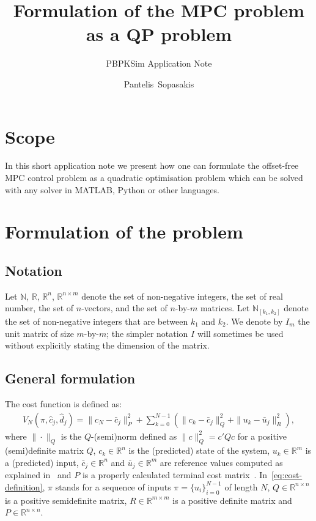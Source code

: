 \documentclass[12pt]{report}
\title{Formulation of the MPC problem as a QP problem}
\subtitle{PBPKSim Application Note}
\author{Pantelis~Sopasakis}
\newcommand{\N}{\mathbb{N}}
\renewcommand{\Re}{\mathbb{R}}
\newcommand{\bcj}{\bar{c}_j}
\newcommand{\buj}{\bar{u}_j}
\begin{document}
\maketitle

\section*{Scope}
In this short application note we present how 
one can formulate the offset-free MPC control problem
as a quadratic optimisation problem which can be solved
with any solver in MATLAB, Python or other languages. 

\section*{Formulation of the problem}

\subsection*{Notation}
Let $\N$, $\Re$, $\Re^n$, $\Re^{n\times m}$ denote the set
of non-negative integers, the set of real number, the set of $n$-vectors,
and the set of $n$-by-$m$ matrices. Let $\N_{[k_1, k_2]}$ denote the
set of non-negative integers that are between $k_1$ and $k_2$.
We denote by $I_m$ the unit matrix of size $m$-by-$m$; the simpler
notation $I$ will sometimes be used without explicitly stating the
dimension of the matrix.

\subsection*{General formulation}
The cost function is defined as:
\begin{align}\label{eq:cost-definition}
V_N(\pi, \hat{c}_j, \hat{d}_j) = \|c_N - \bar{c}_j\|_P^2 + \sum_{k=0}^{N-1}\left( 
\|c_k-\bar{c}_j\|_Q^2+\|u_k-\bar{u}_j\|_R^2
\right),
\end{align}
where $\|\cdot\|_Q$ is the $Q$-(semi)norm defined as $\|c\|_Q^2=c'Qc$ for 
a positive (semi)definite matrix $Q$, $c_k\in\Re^n$ is the (predicted) state of the system,
$u_k\in\Re^m$ is a (predicted) input, $\bcj\in\Re^n$ and $\buj\in\Re^m$ are reference values
computed as explained in~\cite[Eq. (33)]{SopPatSar14} and $P$ is a 
properly calculated terminal cost matrix~\cite[Eq. (32)]{SopPatSar14}.
In~\eqref{eq:cost-definition}, $\pi$ stands for a sequence of inputs
$\pi=\{u_i\}_{i=0}^{N-1}$ of length $N$, $Q\in\Re^{n\times n}$
is a positive semidefinite matrix, $R\in\Re^{m\times m}$ is a 
positive definite matrix and $P\in\Re^{n\times n}$.
\end{document}
